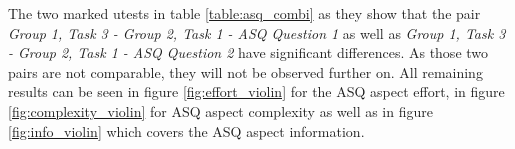 \begin{table}[htb]
  \caption{Two-sided \gls{utest} for each comparable question on the same device}
  \label{table:asq_combi}
  \end{table}

The two marked \glspl{utest} in table \ref{table:asq_combi} as they show that the pair \textit{Group 1, Task 3 - Group 2, Task 1 - ASQ Question 1} as well as \textit{Group 1, Task 3 - Group 2, Task 1 - ASQ Question 2} have significant differences.
As those two pairs are not comparable, they will not be observed further on.
All remaining results can be seen in figure \ref{fig:effort_violin} for the ASQ aspect effort, in figure \ref{fig:complexity_violin} for ASQ aspect complexity as well as in figure \ref{fig:info_violin} which covers the \gls{ASQ} aspect information.

